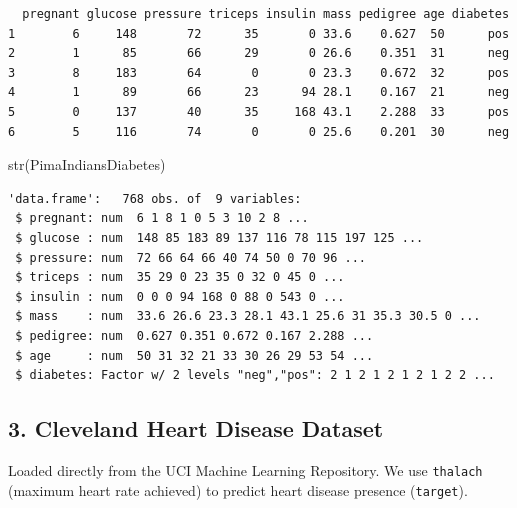 \documentclass[
  letterpaper,
  DIV=11,
  numbers=noendperiod]{scrreprt}
\newenvironment{Shaded}{\begin{snugshade}}{\end{snugshade}}
\newcommand{\FunctionTok}[1]{\textcolor[rgb]{0.28,0.35,0.67}{#1}}
\newcommand{\NormalTok}[1]{\textcolor[rgb]{0.00,0.23,0.31}{#1}}
\begin{document}
\begin{verbatim}
  pregnant glucose pressure triceps insulin mass pedigree age diabetes
1        6     148       72      35       0 33.6    0.627  50      pos
2        1      85       66      29       0 26.6    0.351  31      neg
3        8     183       64       0       0 23.3    0.672  32      pos
4        1      89       66      23      94 28.1    0.167  21      neg
5        0     137       40      35     168 43.1    2.288  33      pos
6        5     116       74       0       0 25.6    0.201  30      neg
\end{verbatim}

\begin{Shaded}
\begin{Highlighting}[]
\FunctionTok{str}\NormalTok{(PimaIndiansDiabetes)}
\end{Highlighting}
\end{Shaded}

\begin{verbatim}
'data.frame':   768 obs. of  9 variables:
 $ pregnant: num  6 1 8 1 0 5 3 10 2 8 ...
 $ glucose : num  148 85 183 89 137 116 78 115 197 125 ...
 $ pressure: num  72 66 64 66 40 74 50 0 70 96 ...
 $ triceps : num  35 29 0 23 35 0 32 0 45 0 ...
 $ insulin : num  0 0 0 94 168 0 88 0 543 0 ...
 $ mass    : num  33.6 26.6 23.3 28.1 43.1 25.6 31 35.3 30.5 0 ...
 $ pedigree: num  0.627 0.351 0.672 0.167 2.288 ...
 $ age     : num  50 31 32 21 33 30 26 29 53 54 ...
 $ diabetes: Factor w/ 2 levels "neg","pos": 2 1 2 1 2 1 2 1 2 2 ...
\end{verbatim}

\subsection{3. Cleveland Heart Disease
Dataset}\label{cleveland-heart-disease-dataset}

Loaded directly from the UCI Machine Learning Repository. We use
\texttt{thalach} (maximum heart rate achieved) to predict heart disease
presence (\texttt{target}).
\end{document}
